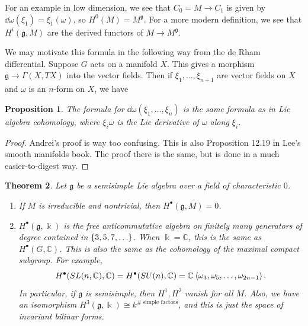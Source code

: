 \documentclass[leqno, openany]{memoir}
\newtheorem{thm}{Theorem}[section]
\newtheorem{prop}[thm]{Proposition}
\theoremstyle{definition}
\theoremstyle{remark}
\theoremstyle{plain}
\theoremstyle{definition}
\theoremstyle{remark}
\newcommand{\C}{\mathbb{C}}
\renewcommand{\k}{\Bbbk}
\newcommand{\mf}[1]{\mathfrak{#1}}
\begin{document}
For an example in low dimension, we see that $C_0 = M \to C_1$ is given by
$\dd{\omega} (\xi_1) = \xi_1 (\omega)$, so $H^0(M) = M^{\mf{g}}$. For a more
modern definition, we see that $H^i(\mf{g}, M)$ are the derived functors of $M
\to M^{\mf{g}}$.

We may motivate this formula in the following way from the de Rham
differential. Suppose $G$ acts on a manifold $X$. This gives a morphism $\mf{g}
\to \Gamma(X, TX)$ into the vector fields. Then if $\xi_1, \ldots, \xi_{n+1}$
are vector fields on $X$ and $\omega$ is an $n$-form on $X$, we have
\begin{prop} The formula for $\dd{\omega} (\xi_1, \ldots, \xi_n)$ is the same
formula as in Lie algebra cohomology, where $\xi_i \omega$ is the Lie
derivative of $\omega$ along $\xi_i$.  \end{prop}

\begin{proof} Andrei's proof is way too confusing. This is also Proposition
12.19 in Lee's smooth manifolds book. The proof there is the same, but is done
in a much easier-to-digest way.  \end{proof}

\begin{thm} Let $\mf{g}$ be a semisimple Lie algebra over a field of
    characteristic $0$.  \begin{enumerate} \item If $M$ is irreducible and
        nontrivial, then $H^{\bullet}(\mf{g}, M) = 0$.  \item
        $H^{\bullet}(\mf{g}, \k)$ is the free anticommutative algebra on
        finitely many generators of degree contained in $\qty{3, 5, 7,
        \ldots}$. When $\k = \C$, this is the same as $H^{\bullet}(G, \C)$.
        This is also the same as the cohomology of the maximal compact
        subgroup. For example, \[ H^{\bullet}(SL(n, \C), \C) =
        H^{\bullet}(SU(n), \C) = \C\ev{\omega_3, \omega_5, \ldots,
    \omega_{2n-1}}. \] In particular, if $\mf{g}$ is semisimple, then $H^{1},
    H^2$ vanish for all $M$. Also, we have an isomorphism $H^3(\mf{g}, \k)
    \cong k^{\#\ \text{simple factors}}$, and this is just the space of
    invariant bilinar forms.  \end{enumerate} \end{thm}
\end{document}
